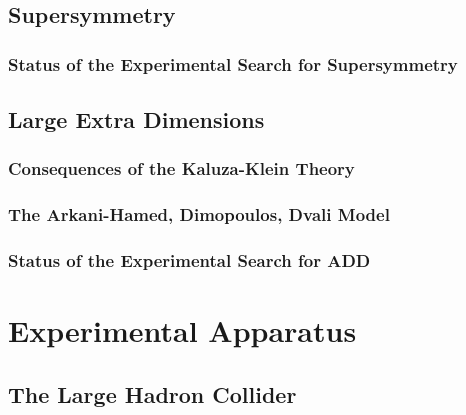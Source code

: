 \documentclass[10pt,twoside,cucitura,classica,english,openany]{toptesi}
\begin{document}


\section{Supersymmetry}
\label{sec:supersymmetry}



\subsection{Status of the Experimental Search for Supersymmetry}
\label{sec:susy-exper-search}



\section{Large Extra Dimensions}
\label{sec:large-extra-dimens}



\subsection{Consequences of the Kaluza-Klein Theory}
\label{sec:cons-kaluza-klein}



\subsection{The Arkani-Hamed, Dimopoulos, Dvali Model}
\label{sec:arkani-hamed-dimop}



\subsection{Status of the Experimental Search for ADD}
\label{sec:add-exper-search}



\chapter{Experimental Apparatus}
\label{cha:exper-appar}

\section{The Large Hadron Collider}
\label{sec:large-hadr-coll}
\end{document}
